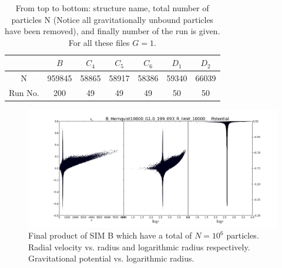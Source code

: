 \begin{table}[h]
\centering
\begin{tabular}{|c|c|c|c|c|c|c|}
\hline
     &   $B$       &    $C_4$    &    $C_5$    &    $C_6$    &   $D_1$     &   $D_2$    \\ \hline
 N   &   959845    &    58865    &    58917    &    58386    &   59340     &   66039    \\ \hline
 Run No.       &   200       &     49      &     49      &      49     &     50      &     50     \\ \hline
\end{tabular}
\caption{From top to bottom: structure name, total number of particles N (Notice all gravitationally unbound particles have been removed), and finally number of the run is given. For all these files $G=1$.}
\end{table}

\begin{figure}
\centering
\includegraphics[width=1.0\linewidth]{img/B_final_vr_V_panel.png}
\caption{Final product of SIM B which have a total of $N = 10^6$ particles. Radial velocity vs. radius and logarithmic radius respectively. Gravitational potential vs. logarithmic radius.}
\label{fig:test}
\end{figure}

